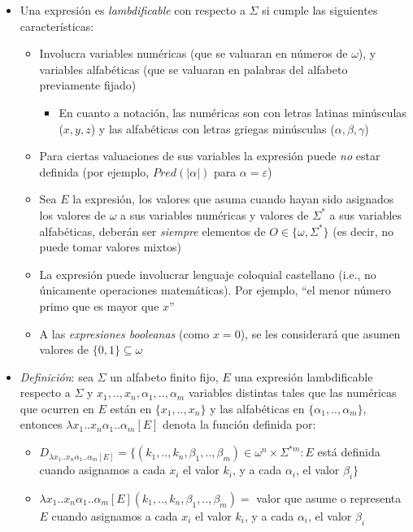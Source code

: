 \documentclass[
]{article}
\providecommand{\tightlist}{%
  \setlength{\itemsep}{0pt}\setlength{\parskip}{0pt}}
\begin{document}
\begin{itemize}
\tightlist
\item
  Una expresión es \emph{lambdificable} con respecto a \(\Sigma\) si
  cumple las siguientes características:

  \begin{itemize}
  \tightlist
  \item
    Involucra variables numéricas (que se valuaran en números de
    \(\omega\)), y variables alfabéticas (que se valuaran en palabras
    del alfabeto previamente fijado)

    \begin{itemize}
    \tightlist
    \item
      En cuanto a notación, las numéricas son con letras latinas
      minúsculas (\(x,y,z\)) y las alfabéticas con letras griegas
      minúsculas (\(\alpha,\beta,\gamma\))
    \end{itemize}
  \item
    Para ciertas valuaciones de sus variables la expresión puede
    \emph{no} estar definida (por ejemplo, \(Pred(|\alpha|)\) para
    \(\alpha=\varepsilon\))
  \item
    Sea \(E\) la expresión, los valores que asuma cuando hayan sido
    asignados los valores de \(\omega\) a sus variables numéricas y
    valores de \(\Sigma^*\) a sus variables alfabéticas, deberán ser
    \emph{siempre} elementos de \(O\in\{\omega,\Sigma^*\}\) (es decir,
    no puede tomar valores mixtos)
  \item
    La expresión puede involucrar lenguaje coloquial castellano (i.e.,
    no únicamente operaciones matemáticas). Por ejemplo, ``el menor
    número primo que es mayor que \(x\)''
  \item
    A las \emph{expresiones booleanas} (como \(x=0\)), se les
    considerará que asumen valores de \(\{0,1\}\subseteq\omega\)
  \end{itemize}
\item
  \emph{Definición}: sea \(\Sigma\) un alfabeto finito fijo, \(E\) una
  expresión lambdificable respecto a \(\Sigma\) y
  \(x_1,..,x_n,\alpha_1,..,\alpha_m\) variables distintas tales que las
  numéricas que ocurren en \(E\) están en \(\{x_1,..,x_n\}\) y las
  alfabéticas en \(\{\alpha_1,..,\alpha_m\}\), entonces
  \(\lambda x_1..x_n\alpha_1..\alpha_m [E]\) denota la función definida
  por:

  \begin{itemize}
  \tightlist
  \item
    \(D_{\lambda x_1..x_n\alpha_1..\alpha_m [E]}=\{(k_1,..,k_n,\beta_1,..,\beta_m)\in\omega^n\times\Sigma^{*m}:E\)
    está definida cuando asignamos a cada \(x_i\) el valor \(k_i\), y a
    cada \(\alpha_i\), el valor \(\beta_i \}\)
  \item
    \(\lambda x_1..x_n\alpha_1..\alpha_m [E](k_1,..,k_n,\beta_1,..,\beta_m)=\)
    valor que asume o representa \(E\) cuando asignamos a cada \(x_i\)
    el valor \(k_i\), y a cada \(\alpha_i\), el valor \(\beta_i\)
  \end{itemize}
\end{itemize}
\end{document}
